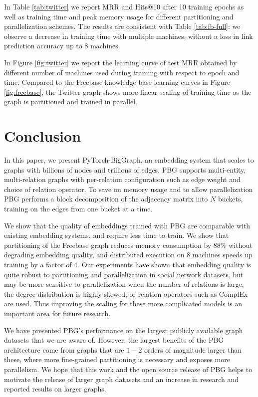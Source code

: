\documentclass{article}
\begin{document}
In Table \ref{tab:twitter} we report MRR and Hits@10 after 10 training epochs as well as training time and peak memory usage for different partitioning and parallelization schemes. The results are consistent with Table \ref{tab:fb-full}: we observe a decrease in training time with multiple machines, without a loss in link prediction accuracy up to 8 machines.

In Figure \ref{fig:twitter} we report the learning curve of test MRR obtained by different number of machines used during training with respect to epoch and time. Compared to the Freebase knowledge base learning curves in Figure \ref{fig:freebase}, the Twitter graph shows more linear scaling of training time as the graph is partitioned and trained in parallel.



\section{Conclusion}
In this paper, we present PyTorch-BigGraph, an embedding system that scales to graphs with billions of nodes and trillions of edges. PBG supports multi-entity, multi-relation graphs with per-relation configuration such as edge weight and choice of relation operator. To save on memory usage and to allow parallelization PBG performs a block decomposition of the adjacency matrix into $N$ buckets, training on the edges from one bucket at a time. 

We show that the quality of embeddings trained with PBG are comparable with existing embedding systems, and require less time to train. We show that partitioning of the Freebase graph reduces memory consumption by 88\% without degrading embedding quality, and distributed execution on 8 machines speeds up training by a factor of 4. Our experiments have shown that embedding quality is quite robust to partitioning and parallelization in social network datasets, but may be more sensitive to parallelization when the number of relations is large, the degree distribution is highly skewed, or relation operators such as ComplEx are used. Thus improving the scaling for these more complicated models is an important area for future research.





We have presented PBG's performance on the largest publicly available graph datasets that we are aware of. However, the largest benefits of the PBG architecture come from graphs that are $1-2$ orders of magnitude larger than these, where more fine-grained partitioning is necessary and exposes more parallelism. We hope that this work and the open source release of PBG helps to motivate the release of larger graph datasets and an increase in research and reported results on larger graphs.
\end{document}
